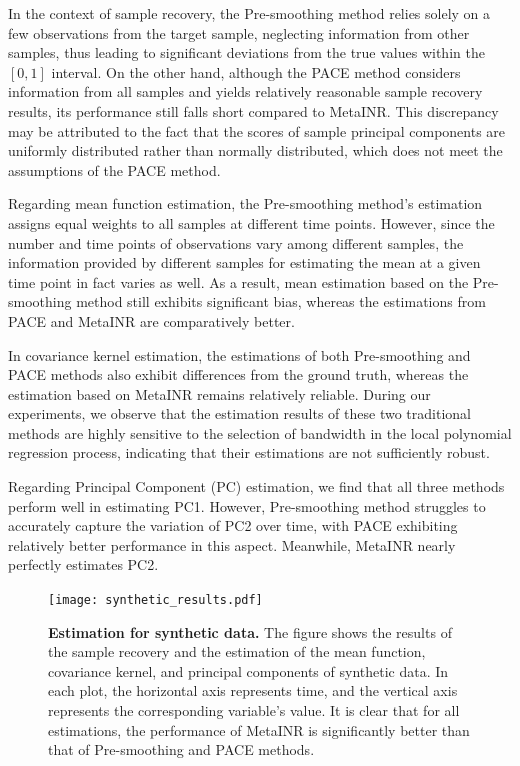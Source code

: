 \documentclass{article}
\begin{document}
In the context of sample recovery, 
the Pre-smoothing method relies solely on a few observations from the target sample, 
neglecting information from other samples, 
thus leading to significant deviations from the true values within the $[0,1]$ interval. 
On the other hand, although the PACE method considers information from all samples and yields relatively reasonable sample recovery results, 
its performance still falls short compared to MetaINR. 
This discrepancy may be attributed to the fact that the scores of sample principal components are uniformly distributed rather than normally distributed, which does not meet the assumptions of the PACE method.

Regarding mean function estimation, the Pre-smoothing method's estimation  assigns equal weights to all samples at different time points. 
However, since the number and time points of observations vary among different samples, the information provided by different samples for estimating the mean at a given time point in fact varies as well. 
As a result, mean estimation based on the Pre-smoothing method still exhibits significant bias, whereas the estimations from PACE and MetaINR are comparatively better.

In covariance kernel estimation, the estimations of both Pre-smoothing and PACE methods also exhibit differences from the ground truth, 
whereas the estimation based on MetaINR remains relatively reliable.
During our experiments, we observe that the estimation results of these two traditional methods are highly sensitive to the selection of bandwidth in the local polynomial regression process, 
indicating that their estimations are not sufficiently robust.

Regarding Principal Component (PC) estimation, we find that all three methods perform well in estimating PC1. 
However, Pre-smoothing method struggles to accurately capture the variation of PC2 over time, 
with PACE exhibiting relatively better performance in this aspect. 
Meanwhile, MetaINR nearly perfectly estimates PC2.


\begin{figure}[htb]
  \centering
  \texttt{[image: synthetic\_results.pdf]}
  \caption{\textbf{Estimation for synthetic data.} The figure shows the results of the sample recovery and the estimation of the mean function, covariance kernel, and principal components of synthetic data. 
  In each plot, the horizontal axis represents time, and the vertical axis represents the corresponding variable's value. 
  It is clear that for all estimations, the performance of MetaINR is significantly better than that of Pre-smoothing and PACE methods. }
  \label{Estimation for synthetic data}
\end{figure}
\end{document}
